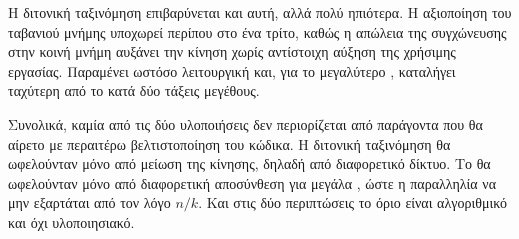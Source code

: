 Η διτονική ταξινόμηση επιβαρύνεται και αυτή, αλλά πολύ ηπιότερα. Η αξιοποίηση
του ταβανιού μνήμης υποχωρεί περίπου στο ένα τρίτο, καθώς η απώλεια της
συγχώνευσης στην κοινή μνήμη αυξάνει την κίνηση χωρίς αντίστοιχη αύξηση της
χρήσιμης εργασίας. Παραμένει ωστόσο λειτουργική και, για το μεγαλύτερο ,
καταλήγει ταχύτερη από το  κατά δύο τάξεις μεγέθους.

Συνολικά, καμία από τις δύο υλοποιήσεις δεν περιορίζεται από παράγοντα που θα
αίρετο με περαιτέρω βελτιστοποίηση του κώδικα. Η διτονική ταξινόμηση θα
ωφελούνταν μόνο από μείωση της κίνησης, δηλαδή από διαφορετικό δίκτυο. Το
 θα ωφελούνταν μόνο από διαφορετική αποσύνθεση για μεγάλα
, ώστε η παραλληλία να μην εξαρτάται από τον λόγο $n/k$. Και στις δύο
περιπτώσεις το όριο είναι αλγοριθμικό και όχι υλοποιησιακό.
